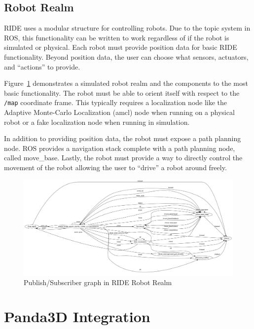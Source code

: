 \subsection{Robot Realm}
\label{section:robot-architecture}
RIDE uses a modular structure for controlling robots. Due to the topic system in ROS, this functionality can be written to work regardless of if the robot is simulated or physical. Each robot must provide position data for basic RIDE functionality. Beyond position data, the user can choose what sensors, actuators, and ``actions'' to provide.

Figure~\ref{fig:ride-robot-realm} demonstrates a simulated robot realm and the components to the most basic functionality. The robot must be able to orient itself with respect to the \verb!/map! coordinate frame. This typically requires a localization node like the Adaptive Monte-Carlo Localization (amcl) node when running on a physical robot or a fake localization node when running in simulation.

In addition to providing position data, the robot must expose a path planning node. ROS provides a navigation stack complete with a path planning node, called move\_base. Lastly, the robot must provide a way to directly control the movement of the robot allowing the user to ``drive'' a robot around freely.

\begin{figure}[ht]
\includegraphics[width=\textwidth]{images/ride-robot-realm.png}
\caption{Publish/Subscriber graph in RIDE Robot Realm\label{fig:ride-robot-realm}}
\end{figure}


\section{Panda3D Integration}

